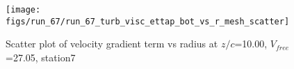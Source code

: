 \begin{figure}[H]
\centering
\texttt{[image: figs/run\_67/run\_67\_turb\_visc\_ettap\_bot\_vs\_r\_mesh\_scatter]}
\caption{Scatter plot of velocity gradient term vs radius at $z/c$=10.00, $V_{free}$=27.05, station7}
\label{fig:run_67_turb_visc_ettap_bot_vs_r_mesh_scatter}
\end{figure}


